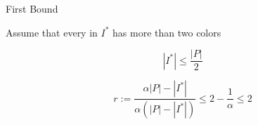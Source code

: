 \begin{frame}{First Bound}

Assume that every \pack{} in $I^*$ has more than two colors


\pause
\begin{observation}
$$ |I^*| \leq \frac{|P|}{2} $$
\end{observation}

\pause
\begin{corollary}
$$
r 													:= 
\frac{\alpha |P| - |I^*|}{\alpha (|P| - |I^*|)} 	\leq 
2 - \frac{1}{\alpha} 								\leq 
2
$$
\end{corollary}


\end{frame}

